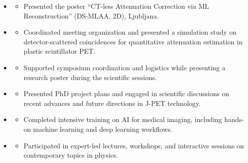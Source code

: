 \begin{itemize}
\item {}
    \begin{itemize}
        \item Presented the poster ``CT-less Attenuation Correction via ML Reconstruction'' (DS-MLAA, 2D), Ljubljana.
    \end{itemize}

\item {}
    \begin{itemize}
        \item Coordinated meeting organization and presented a simulation study on detector-scattered coincidences for quantitative attenuation estimation in plastic scintillator PET.
    \end{itemize}

\item {}
    \begin{itemize}
        \item Supported symposium coordination and logistics while presenting a research poster during the scientific sessions.
    \end{itemize}

\item {}
    \begin{itemize}
        \item Presented PhD project plans and engaged in scientific discussions on recent advances and future directions in J-PET technology.
    \end{itemize}


\item {}
    \begin{itemize}
        \item Completed intensive training on AI for medical imaging, including hands-on machine learning and deep learning workflows.
    \end{itemize}

\item {}
    \begin{itemize}
        \item Participated in expert-led lectures, workshops, and interactive sessions on contemporary topics in physics.
    \end{itemize}

\end{itemize}
